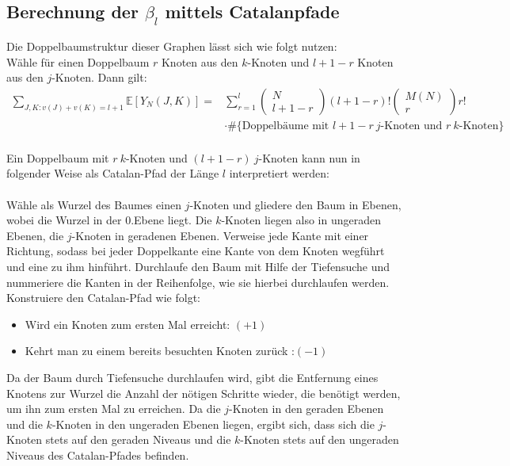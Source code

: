 \documentclass[a4paper, 11pt]{scrreprt}
\newcommand{\EE}{\mathbb{E}}
\newcommand{\student}[1]{\marginnote{{\normalfont\bf #1}}}
\begin{document}
\subsection*{Berechnung der $ \beta_l $ mittels Catalanpfade}
\student{Dominik}
Die Doppelbaumstruktur dieser Graphen lässt sich wie folgt nutzen:\\
Wähle für einen Doppelbaum \(r\) Knoten aus den \(k\)-Knoten und \(l+1-r\) Knoten aus den \(j\)-Knoten. Dann gilt:
\begin{equation}
	\begin{split}
	\sum_{J,K: v(J)+v(K) = l+1} \EE[Y_N(J,K)] = &\sum_{r=1}^{l}\begin{pmatrix} N\\ l+1-r\end{pmatrix} (l+1-r)! \begin{pmatrix} M(N)\\r\end{pmatrix} r! \\
	&\cdot \#\{\text{Doppelbäume mit }l+1-r\ j\text{-Knoten und } r\ k\text{-Knoten}\} \\
	\end{split}
\end{equation}

Ein Doppelbaum mit \(r\  k\)-Knoten und \((l+1-r)\ j\)-Knoten kann nun in folgender Weise als Catalan-Pfad der Länge \(l\) interpretiert werden:\\\\
Wähle als Wurzel des Baumes einen \(j\)-Knoten und gliedere den Baum in Ebenen, wobei die Wurzel in der 0.Ebene liegt. Die \(k\)-Knoten liegen also in ungeraden Ebenen, die \(j\)-Knoten in geradenen Ebenen. Verweise jede Kante mit einer Richtung, sodass bei jeder Doppelkante eine Kante von dem Knoten wegführt und eine zu ihm hinführt. Durchlaufe den Baum mit Hilfe der Tiefensuche und nummeriere die Kanten in der Reihenfolge, wie sie hierbei durchlaufen werden. Konstruiere den Catalan-Pfad wie folgt:
\begin{itemize}
	\item Wird ein Knoten zum ersten Mal erreicht: \((+1)\)
	\item Kehrt man zu einem bereits besuchten Knoten zurück :\((-1)\)
	
\end{itemize}
Da der Baum durch Tiefensuche durchlaufen wird, gibt die Entfernung eines Knotens zur Wurzel die Anzahl der nötigen Schritte wieder, die benötigt werden, um ihn zum ersten Mal zu erreichen. Da die \(j\)-Knoten in den geraden Ebenen und die \(k\)-Knoten in den ungeraden Ebenen liegen, ergibt sich, dass sich die \(j\)-Knoten stets auf den geraden Niveaus und die \(k\)-Knoten stets auf den ungeraden Niveaus des Catalan-Pfades befinden. 
\end{document}
